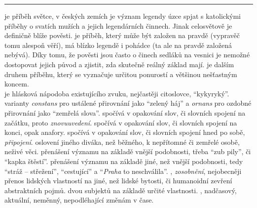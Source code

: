 \documentclass{extarticle} %
\begin{document}
\noindent\begin{minipage}{\textwidth}
    {\textcolor{\wpagecolor}{\rule{\linewidth}{0.4pt}}
    \changefontsize{7pt}
    \footnotesize
     je příběh světce, v českých zemích je význam legendy úzce spjat s katolickými příběhy o svatích mužích a jejich legendárních činnech. Jinak celosvětově je definičně blíže pověsti.
     je příběh, který může být založen na pravdě (vypravěč tomu alespoň věří), má blízko legendě i pohádce (ta ale na pravdě založená nebývá). Díky tomu, že pověsti jsou často o činech sedláků na vesnici je nemožné dostopovat jejich původ a zjistit, zda skutečně reálný základ mají.
     je dalším druhem příběhu, který se vyznačuje určitou ponurostí a většinou nešťastným koncem. \\
     je hlásková nápodoba existujícího zvuku, nejčastěji citoslovce, \enquote{kykyryký}.
     varianty \textit{constans} pro ustálené přirovnání jako \enquote{zelený háj} a \textit{ornans} pro ozdobné přirovnání jako \enquote{zemřelá slova}.
     spočívá v opakování slov, či slovních spojení na začátku, proto \textit{znovuuvedení}.
     spočívá v opakování slov, či slovních spojení na konci, opak anafory.
     spočívá v opakování slov, či slovních spojení hned po sobě, \textit{připojení}.
     oslovení jiného diváka, než běžného, k nepřítomné či zemřelé osobě, neživé věci.
     přenášení významu na základě vnější podobnosti, třeba \enquote{zub pily}, či \enquote{kapka štěstí}.
     přenášení významu na základě jiné, než vnější podobnosti, tedy \enquote{stráž -- střežení}, \enquote{cestující} a \enquote{\textit{Praha} to neschválila}.
    , \textit{zosobnění}, nejobecněji přenos lidských vlastností na jiné, než lidské bytosti, či humanoidní zevření abstraktních pojmů.
     dvou subjektů na základě určité vlastnosti.
    , nadčasový, aktuální, neměnný, nepodléhající změnám v čase.
    }
\end{minipage}

\newpage


\changefontsize{8pt}

\end{document}
